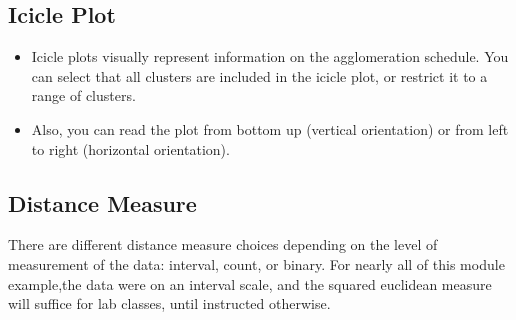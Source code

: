 
\subsection{Icicle Plot} 
\begin{itemize}
	\item Icicle plots visually represent information on the agglomeration
	schedule. You can select that all clusters are included in the icicle plot, or restrict it to a range of
	clusters. 
	\item Also, you can read the plot from bottom up (vertical orientation) or from left to right
	(horizontal orientation).
\end{itemize}
\subsection{Distance Measure} There are different distance measure choices depending on the level of measurement
of the data: interval, count, or binary.
For nearly all of this module example,the data were on an interval scale, and the squared euclidean measure will suffice for lab classes, until instructed otherwise.

